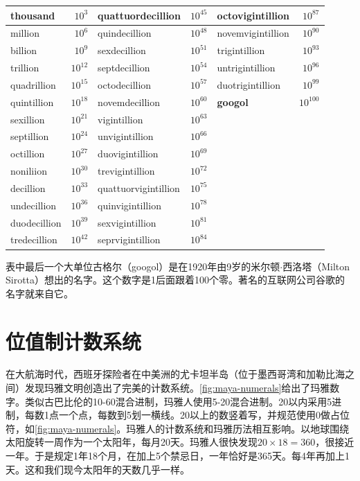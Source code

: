 \documentclass[b5paper]{ctexart}
\begin{document}
\begin{center}
\begin{tabular}{|l|r|l|r|l|r|}
\hline
thousand & $10^{3}$ & quattuordecillion & $10^{45}$ & octovigintillion & $10^{87}$ \\
\hline
million & $10^{6}$ & quindecillion & $10^{48}$ & novemvigintillion & $10^{90}$ \\
\hline
billion & $10^{9}$ & sexdecillion & $10^{51}$ & trigintillion & $10^{93}$ \\
\hline
trillion  & $10^{12}$ & septdecillion & $10^{54}$ & untrigintillion & $10^{96}$ \\
\hline
quadrillion  & $10^{15}$ & octodecillion & $10^{57}$ & duotrigintillion & $10^{99}$ \\
\hline
quintillion  & $10^{18}$ & novemdecillion & $10^{60}$ & \textbf{googol} & $10^{100}$ \\
\hline
sexillion    & $10^{21}$ & vigintillion & $10^{63}$ & & \\
\hline
septillion   & $10^{24}$ & unvigintillion & $10^{66}$ & & \\
\hline
octillion    & $10^{27}$ & duovigintillion & $10^{69}$ & & \\
\hline
noniliion  & $10^{30}$ & trevigintillion & $10^{72}$ & & \\
\hline
decillion  & $10^{33}$ & quattuorvigintillion & $10^{75}$ & & \\
\hline
undecillion   & $10^{36}$ & quinvigintillion & $10^{78}$ & & \\
\hline
duodecillion  & $10^{39}$ & sexvigintillion & $10^{81}$ & & \\
\hline
tredecillion  & $10^{42}$ & seprvigintillion & $10^{84}$ & & \\
\hline
\end{tabular}
\end{center}

表中最后一个大单位古格尔（googol）是在1920年由9岁的米尔顿$\cdot$西洛塔（Milton Sirotta）想出的名字。这个数字是1后面跟着100个零。著名的互联网公司谷歌的名字就来自它。

\section{位值制计数系统}

在大航海时代，西班牙探险者在中美洲的尤卡坦半岛（位于墨西哥湾和加勒比海之间）发现玛雅文明创造出了完美的计数系统。\cref{fig:maya-numerals}给出了玛雅数字。类似古巴比伦的10-60混合进制，玛雅人使用5-20混合进制。20以内采用5进制，每数1点一个点，每数到5划一横线。20以上的数竖着写，并规范使用0做占位符，如\cref{fig:maya-numerals}。玛雅人的计数系统和玛雅历法相互影响。以地球围绕太阳旋转一周作为一个太阳年，每月20天。玛雅人很快发现$20 \times 18 = 360$，很接近一年。于是规定1年18个月，在加上5个禁忌日，一年恰好是365天。每4年再加上1天。这和我们现今太阳年的天数几乎一样。
\end{document}
